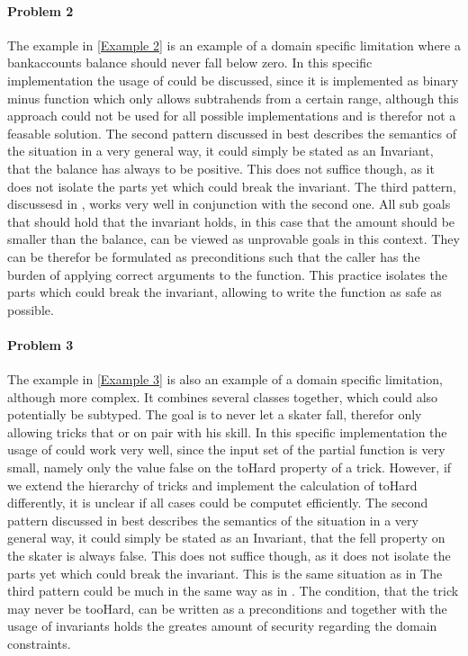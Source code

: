 \paragraph{Problem 2} \label{Problem 2}
The example in \ref{Example 2} is an example of a domain specific limitation where a bankaccounts balance should never fall below zero. In this specific implementation the usage of  could be discussed, since it is implemented as binary minus function which only allows subtrahends from a certain range, although this approach could not be used for all possible implementations and is therefor not a feasable solution. \newline
The second pattern discussed in  best describes the semantics of the situation in a very general way, it could simply be stated as an Invariant, that the balance has always to be positive. This does not suffice though, as it does not isolate the parts yet which could break the invariant. \newline
The third pattern, discussesd in , works very well in conjunction with the second one. All sub goals that should hold that the invariant holds, in this case that the amount should be smaller than the balance, can be viewed as unprovable goals in this context. They can be therefor be formulated as preconditions such that the caller has the burden of applying correct arguments to the function. This practice isolates the parts which could break the invariant, allowing to write the function as safe as possible.

\paragraph{Problem 3}
The example in \ref{Example 3} is also an example of a domain specific limitation, although more complex. It combines several classes together, which could also potentially be subtyped. The goal is to never let a skater fall, therefor only allowing tricks that or on pair with his skill. In this specific implementation the usage of  could work very well, since the input set of the partial function is very small, namely only the value false on the toHard property of a trick. However, if we extend the hierarchy of tricks and implement the calculation of toHard differently, it is unclear if all cases could be computet efficiently. \newline
The second pattern discussed in  best describes the semantics of the situation in a very general way, it could simply be stated as an Invariant, that the fell property on the skater is always false. This does not suffice though, as it does not isolate the parts yet which could break the invariant. This is the same situation as in  \newline
The third pattern could be much in the same way as in . The condition, that the trick may never be tooHard, can be written as a preconditions and together with the usage of invariants holds the greates amount of security regarding the domain constraints.

